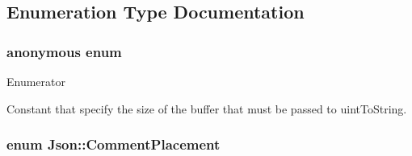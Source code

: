 \subsection{Enumeration Type Documentation}
\hypertarget{namespace_json_a0c5f614b019f20b4598dcaec09d9e820}{\subsubsection[{anonymous enum}]{\setlength{\rightskip}{0pt plus 5cm}anonymous enum}}\label{namespace_json_a0c5f614b019f20b4598dcaec09d9e820}
\begin{Desc}
\item[Enumerator]\par
\begin{description}
\item[{\em 
\hypertarget{namespace_json_a0c5f614b019f20b4598dcaec09d9e820ae4f2008c7919f20d81286121d1374424}{uint\-To\-String\-Buffer\-Size}\label{namespace_json_a0c5f614b019f20b4598dcaec09d9e820ae4f2008c7919f20d81286121d1374424}
}]Constant that specify the size of the buffer that must be passed to uint\-To\-String. \end{description}
\end{Desc}
\hypertarget{namespace_json_a4fc417c23905b2ae9e2c47d197a45351}{
\subsubsection[{Comment\-Placement}]{\setlength{\rightskip}{0pt plus 5cm}enum {\bf Json\-::\-Comment\-Placement}}}\label{namespace_json_a4fc417c23905b2ae9e2c47d197a45351}
